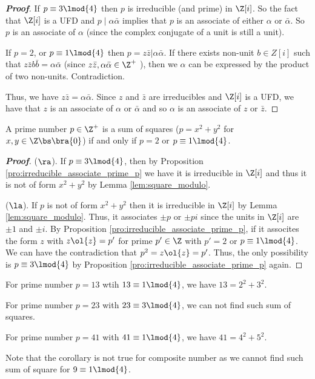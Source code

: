 \begin{proof}[\bf Proof]
If $p \equiv 3 \lmod{4}$ then $p$ is irreducible (and prime) in $\Z[i]$. So the fact that $\Z[i]$ is a UFD and $p \mid \alpha\bar{\alpha}$ implies that $p$ is an associate of either $\alpha$ or $\bar{\alpha}$. So $p$ is an associate of $\alpha$ (since the complex conjugate of a unit is still a unit).

If $p = 2$, or $p \equiv 1 \lmod{4}$ then $p = z\bar{z} | \alpha\bar{\alpha}$. If there exists non-unit $b\in Z[i]$ such that $z\bar{z}b\bar{b} = \alpha \bar{\alpha}$ (since $z\bar{z}, \alpha\bar{\alpha} \in \Z^+$ ), then we $\alpha$ can be expressed by the product of two non-units. Contradiction.

Thus, we have $z\bar{z} = \alpha\bar{\alpha}$. Since $z$ and $\bar{z}$ are irreducibles and $\Z[i]$ is a UFD, we have that $z$ is an associate of $\alpha$ or $\bar{\alpha}$ and so $\alpha$ is an associate of $z$ or $\bar{z}$. %
\end{proof}



\begin{corollary}\label{cor:prime_equals_square_sum}
A prime number $p\in \Z^+$ is a sum of squares ($p= x^2 +y^2$ for $x,y\in \Z\bs\bra{0}$) if and only if $p=2$ or $p \equiv 1\lmod{4}$.
\end{corollary}

\begin{proof}[\bf Proof]
($\ra$). If $p \equiv 3\lmod{4}$, then by Proposition \ref{pro:irreducible_associate_prime_p} we have it is irreducible in $\Z[i]$ and thus it is not of form $x^2+y^2$ by Lemma \ref{lem:square_modulo}.

($\la$). If $p$ is not of form $x^2+y^2$ then it is irreducible in $\Z[i]$ by Lemma \ref{lem:square_modulo}. Thus, it associates $\pm p$ or $\pm pi$ since the units in $\Z[i]$ are $\pm 1$ and $\pm i$. By Proposition \ref{pro:irreducible_associate_prime_p}, if it assocites the form $z$ with $z\ol{z} = p'$ for prime $p'\in \Z$ with $p'=2$ or $p\equiv 1\lmod{4}$. We can have the contradiction that $p^2 = z\ol{z} = p'$. Thus, the only possibility is $p\equiv 3\lmod{4}$ by Proposition \ref{pro:irreducible_associate_prime_p} again.
\end{proof}

\begin{example}
For prime number $p=13$ wtih $13\equiv 1\lmod{4}$, we have $13 = 2^2 + 3^2$.

For prime number $p=23$ with $23 \equiv 3 \lmod{4}$, we can not find such sum of squares.

For prime number $p = 41$ with $41\equiv 1\lmod{4}$, we have $41 = 4^2 + 5^2$.

Note that the corollary is not true for composite number as we cannot find such sum of square for $9\equiv 1\lmod{4}$.
\end{example}

